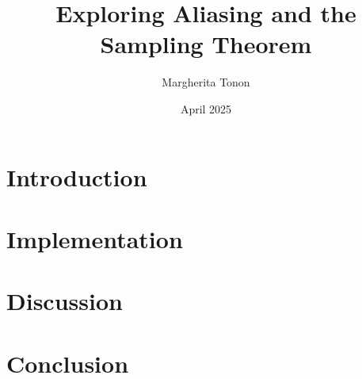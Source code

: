 \documentclass{article}
\title{Exploring Aliasing and the Sampling Theorem} %
\author{Margherita Tonon}
\date{April 2025}
\begin{document}
\maketitle

\section{Introduction}

\section{Implementation}


\section{Discussion}

\section{Conclusion}
\end{document}
